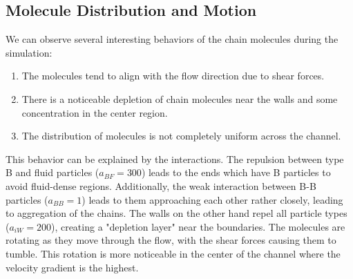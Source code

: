\subsection{Molecule Distribution and Motion}
We can observe several interesting behaviors of the chain molecules during the simulation:
\begin{enumerate}
	\item The molecules tend to align with the flow direction due to shear forces.
	\item There is a noticeable depletion of chain molecules near the walls and some concentration in the center region.
	\item The distribution of molecules is not completely uniform across the channel.
\end{enumerate}
This behavior can be explained by the interactions. The repulsion between type B and fluid particles ($a_{BF} = 300$) leads to the ends which have B particles to avoid fluid-dense regions. Additionally, the weak interaction between B-B particles ($a_{BB} = 1$) leads to them  approaching each other rather closely, leading to aggregation of the chains. The walls on the other hand repel all particle types ($a_{iW} = 200$), creating a "depletion layer" near the boundaries.
The molecules are rotating as they move through the flow, with the shear forces causing them to tumble. This rotation is more noticeable in the center of the channel where the velocity gradient is the highest.
